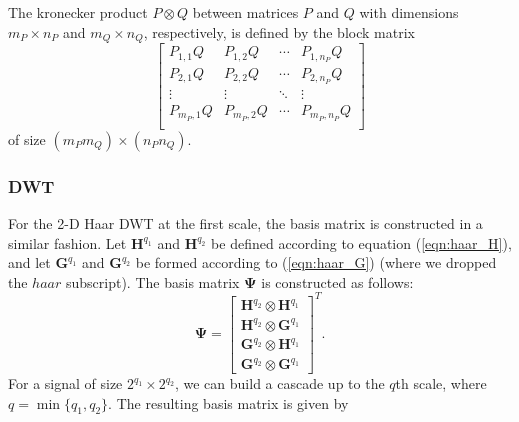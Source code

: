 The kronecker product $P \otimes Q$ between matrices $P$ and $Q$ with dimensions $m_P \times n_P$ and $m_Q \times n_Q$, respectively,  is defined by the block matrix
\begin{equation}
\label{eqn:kron}
\begin{bmatrix}
P_{1,1} Q & P_{1,2} Q & \cdots & P_{1,n_P} Q \\
P_{2,1} Q & P_{2,2} Q & \cdots & P_{2,n_P} Q \\
\vdots&\vdots&\ddots&\vdots \\
P_{m_P,1} Q & P_{m_P,2} Q & \cdots & P_{m_P,n_P} Q \\
\end{bmatrix}
\end{equation}
of size $(m_Pm_Q) \times (n_Pn_Q)$.

\subsubsection{DWT}
For the 2-D Haar DWT at the first scale, the basis matrix is constructed in a similar fashion.
Let $\bm H^{q_1}$ and $\bm H^{q_2}$ be defined according to equation (\ref{eqn:haar_H}), and let $\bm G^{q_1}$ and $\bm G^{q_2}$  be formed according to (\ref{eqn:haar_G}) (where we dropped the $haar$ subscript). 
The basis matrix $\bm\Psi$ is constructed as follows:
\begin{equation*}
 \bm \Psi = 
  \begin{bmatrix}
    \bm H^{q_2} \otimes\bm H^{q_1} \\
    \bm H^{q_2} \otimes \bm G^{q_1} \\
    \bm G^{q_2} \otimes \bm H^{q_1} \\
    \bm G^{q_2} \otimes \bm G^{q_1} 
  \end{bmatrix}^T.
\end{equation*}
For a signal of size $2^{q_1}\times 2^{q_2}$, we can build a cascade up to the $q$th scale, where $q = \min\{q_1,q_2\}$.
The resulting basis matrix is given by
